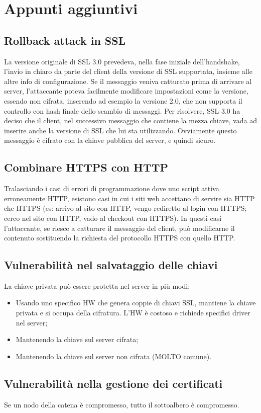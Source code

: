 \section{Appunti aggiuntivi}

\subsection{Rollback attack in SSL}

La versione originale di SSL 3.0 prevedeva, nella fase iniziale dell'handshake, l'invio in chiaro da parte del client della versione di SSL supportata, insieme alle altre info di configurazione. Se il messaggio veniva catturato prima di arrivare al server, l'attaccante poteva facilmente modificare impostazioni come la versione, essendo non cifrata, inserendo ad esempio la versione 2.0, che non supporta il controllo con hash finale dello scambio di messaggi.
Per risolvere, SSL 3.0 ha deciso che il client, nel successivo messaggio che contiene la mezza chiave, vada ad inserire anche la versione di SSL che lui sta utilizzando. Ovviamente questo messaggio è cifrato con la chiave pubblica del server, e quindi sicuro.

\subsection{Combinare HTTPS con HTTP}

Tralasciando i casi di errori di programmazione dove uno script attiva erroneamente HTTP, esistono casi in cui i siti web accettano di servire sia HTTP che HTTPS (es: arrivo al sito con HTTP, vengo rediretto al login con HTTPS; cerco nel sito con HTTP, vado al checkout con HTTPS). In questi casi l'attaccante, se riesce a catturare il messaggio del client, può modificarne il contenuto sostituendo la richiesta del protocollo HTTPS con quello HTTP.

\subsection{Vulnerabilità nel salvataggio delle chiavi}

La chiave privata può essere protetta nel server in più modi:
\begin{itemize}
    \item  Usando uno specifico HW che genera coppie di chiavi SSL, mantiene la chiave privata e si occupa della cifratura. L'HW è costoso e richiede specifici driver nel server;
	\item Mantenendo la chiave sul server cifrata;
	\item Mantenendo la chiave sul server non cifrata (MOLTO comune).
\end{itemize}
 
\subsection{Vulnerabilità nella gestione dei certificati}

Se un nodo della catena è compromesso, tutto il sottoalbero è compromesso.


